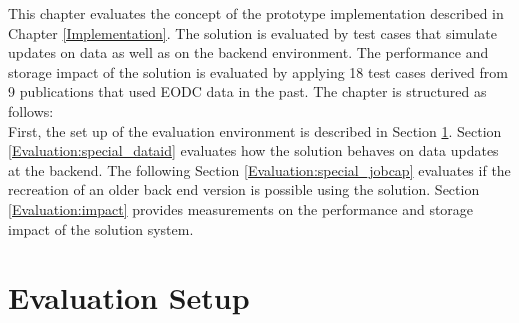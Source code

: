 \documentclass[draft,final]{vutinfth} %
\begin{document}
This chapter evaluates the concept of the prototype implementation described in Chapter \ref{Implementation}. The solution is evaluated by test cases that simulate updates on data as well as on the backend environment. The performance and storage impact of the solution is evaluated by applying 18 test cases derived from 9 publications that used EODC data in the past. The chapter is structured as follows: \\
First, the set up of the evaluation environment is described in Section \ref{Evaluation:Setup}. Section \ref{Evaluation:special_dataid} evaluates how the solution behaves on data updates at the backend. The following Section \ref{Evaluation:special_jobcap}  evaluates if the recreation of an older back end version is possible using the solution. Section \ref{Evaluation:impact} provides measurements on the performance and storage impact of the solution system. 

\section{Evaluation Setup}\label{Evaluation:Setup}
\end{document}

